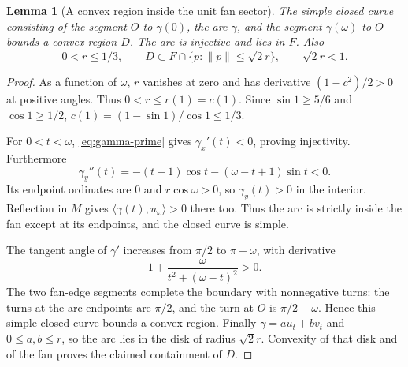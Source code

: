 \documentclass[11pt]{article}
\newtheorem{lemma}[theorem]{Lemma}
\theoremstyle{remark}\newtheorem{remark}[theorem]{Remark}
\newcommand{\ip}[2]{\langle #1,#2\rangle}
\begin{document}
\begin{lemma}[A convex region inside the unit fan sector]\label{lem:region}
The simple closed curve consisting of the segment $O$ to $\gamma(0)$, the arc $\gamma$, and the segment $\gamma(\omega)$ to $O$ bounds a convex region $D$. The arc is injective and lies in $F$. Also
\[
 0<r\le1/3,\qquad D\subset F\cap\{p:\lVert p\rVert\le\sqrt2 r\},\qquad\sqrt2 r<1.
\]
\end{lemma}
\begin{proof}
As a function of $\omega$, $r$ vanishes at zero and has derivative $(1-c^2)/2>0$ at positive angles. Thus $0<r\le r(1)=c(1)$. Since $\sin1\ge5/6$ and $\cos1\ge1/2$, $c(1)=(1-\sin1)/\cos1\le1/3$.

For $0<t<\omega$, \eqref{eq:gamma-prime} gives $\gamma_x'(t)<0$, proving injectivity. Furthermore
\[
 \gamma_y''(t)=-(t+1)\cos t-(\omega-t+1)\sin t<0.
\]
Its endpoint ordinates are $0$ and $r\cos\omega>0$, so $\gamma_y(t)>0$ in the interior. Reflection in $M$ gives $\ip{\gamma(t)}{u_\omega}>0$ there too. Thus the arc is strictly inside the fan except at its endpoints, and the closed curve is simple.

The tangent angle of $\gamma'$ increases from $\pi/2$ to $\pi+\omega$, with derivative
\[
 1+\frac{\omega}{t^2+(\omega-t)^2}>0.
\]
The two fan-edge segments complete the boundary with nonnegative turns: the turns at the arc endpoints are $\pi/2$, and the turn at $O$ is $\pi/2-\omega$. Hence this simple closed curve bounds a convex region. Finally $\gamma=a u_t+b v_t$ and $0\le a,b\le r$, so the arc lies in the disk of radius $\sqrt2 r$. Convexity of that disk and of the fan proves the claimed containment of $D$.
\end{proof}
\end{document}
